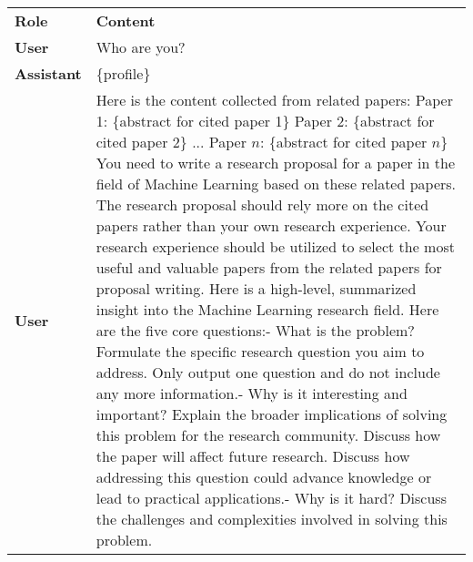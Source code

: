 \begin{table*}[ht]
\centering
\footnotesize
\renewcommand{\arraystretch}{1.3}
\begin{tabular}{p{1cm}p{11.5cm}}
\toprule[1.5pt]
\textbf{Role} & \textbf{Content} \\ 
\cmidrule[0.5pt](lr){1-2}
\textbf{User} & Who are you? \\ 
\midrule
\textbf{Assistant} & \{profile\}\\
\midrule
\textbf{User} & Here is the content collected from related papers:\newline
Paper 1: \{abstract for cited paper 1\}\newline
Paper 2: \{abstract for cited paper 2\}\newline
...\newline
Paper $n$: \{abstract for cited paper $n$\}\newline
You need to write a research proposal for a paper in the field of Machine Learning based on these related papers.\newline
The research proposal should rely more on the cited papers rather than your own research experience.\newline
Your research experience should be utilized to select the most useful and valuable papers from the related papers for proposal writing.\newline
Here is a high-level, summarized insight into the Machine Learning research field.\newline
Here are the five core questions:\newline
[Question 1] - What is the problem?\newline
Formulate the specific research question you aim to address.\newline
Only output one question and do not include any more information.\newline
[Question 2] - Why is it interesting and important?\newline
Explain the broader implications of solving this problem for the research community.\newline
Discuss how the paper will affect future research.\newline
Discuss how addressing this question could advance knowledge or lead to practical applications.\newline
[Question 3] - Why is it hard?\newline
Discuss the challenges and complexities involved in solving this problem.\newline

\end{tabular}
\end{table*}
